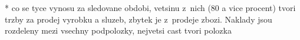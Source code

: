 * co se tyce vynosu za sledovane obdobi, vetsinu z~nich (80 a vice procent) tvori trzby za prodej vyrobku a sluzeb, zbytek je z~prodeje zbozi. Naklady jsou rozdeleny mezi vsechny podpolozky, nejvetsi cast tvori polozka 

